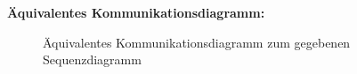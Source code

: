 \documentclass{swp1}
\begin{document}
\textbf{Äquivalentes Kommunikationsdiagramm:}
\begin{figure}[h]
\caption{Äquivalentes Kommunikationsdiagramm zum gegebenen Sequenzdiagramm}
\label{ab3}
\end{figure}
\end{document}
